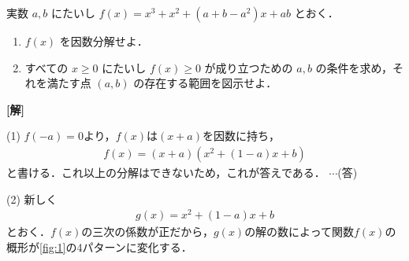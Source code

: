 \documentclass[a4paper,10pt]{ltjsarticle}
\begin{document}
\begin{oframed}
  実数 $a, b$ にたいし $f(x) = x^3 + x^2 + (a+b-a^2)x + ab$ とおく．

  \begin{enumerate}
    \item $f(x)$ を因数分解せよ．

    \item すべての $x \ge 0$ にたいし $f(x) \ge 0$ が成り立つための $a, b$ の条件を求め，それを満たす点 $(a, b)$ の存在する範囲を図示せよ．
  \end{enumerate}
\end{oframed}
\setlength{\columnseprule}{0.4pt}
\begin{multicols}{2}
  {\bf[解]}

  (1)
  $f(-a)=0$より，$f(x)$は$(x+a)$を因数に持ち，
  \begin{align*}
    f(x)=(x+a)(x^2+(1-a)x+b)
  \end{align*}
  と書ける．これ以上の分解はできないため，これが答えである．  $\cdots$(答)

  \vspace{10pt}
  (2)
  新しく
  \begin{align*}
    g(x) = x^2+(1-a)x+b
  \end{align*}
  とおく．$f(x)$の三次の係数が正だから，$g(x)$の解の数によって関数$f(x)$の概形が\cref{fig:1}の4パターンに変化する．


\end{multicols}
\end{document}
